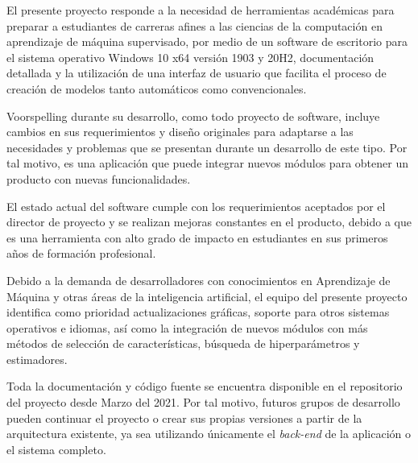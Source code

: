 El presente proyecto responde a la necesidad de herramientas académicas para preparar a estudiantes de carreras afines a las ciencias de la computación en aprendizaje de máquina supervisado, por medio de un software de escritorio para el sistema operativo Windows 10 x64 versión 1903 y 20H2, documentación detallada y la utilización de una interfaz de usuario que facilita el proceso de creación de modelos tanto automáticos como convencionales.

Voorspelling durante su desarrollo, como todo proyecto de software, incluye cambios en sus requerimientos y diseño originales para adaptarse a las necesidades y problemas que se presentan durante un desarrollo de este tipo. Por tal motivo, es una aplicación que puede integrar nuevos módulos para obtener un producto con nuevas funcionalidades.

El estado actual del software cumple con los requerimientos aceptados por el director de proyecto y se realizan mejoras constantes en el producto, debido a que es una herramienta con alto grado de impacto en estudiantes en sus primeros años de formación profesional.

Debido a la demanda de desarrolladores con conocimientos en Aprendizaje de Máquina y otras áreas de la inteligencia artificial, el equipo del presente proyecto identifica como prioridad actualizaciones gráficas, soporte para otros sistemas operativos e idiomas, así como la integración de nuevos módulos con más métodos de selección de características, búsqueda de hiperparámetros y estimadores.

Toda la documentación y código fuente se encuentra disponible en el repositorio del proyecto desde Marzo del 2021. Por tal motivo, futuros grupos de desarrollo pueden continuar el proyecto o crear sus propias versiones a partir de la arquitectura existente, ya sea utilizando únicamente el \textit{back-end} de la aplicación o el sistema completo.
 
